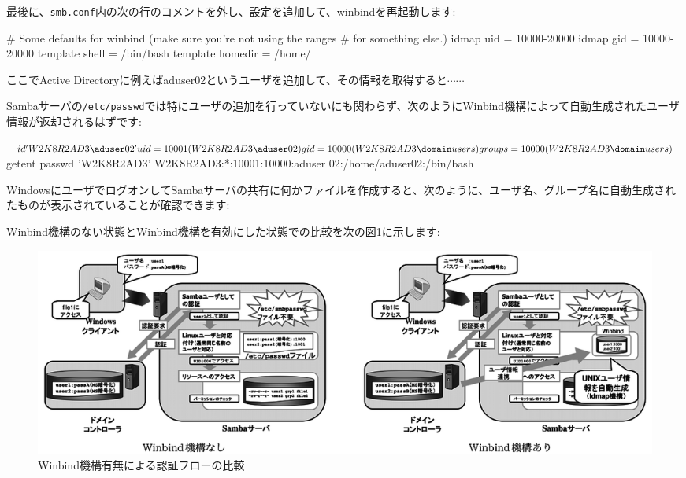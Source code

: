\documentclass[mingoth,a4paper]{jsarticle}
\begin{document}
最後に、{\tt{smb.conf}}内の次の行のコメントを外し、設定を追加して、winbindを再起動します:

\begin{commandline}
# Some defaults for winbind (make sure you're not using the ranges
# for something else.)
   idmap uid = 10000-20000
   idmap gid = 10000-20000
   template shell = /bin/bash
   template homedir = /home/%
\end{commandline}

ここでActive Directoryに例えばaduser02というユーザを追加して、その情報を取得すると$\cdots \cdots$

Sambaサーバの{\tt{/etc/passwd}}では特にユーザの追加を行っていないにも関わらず、次のようにWinbind機構によって自動生成されたユーザ情報が返却されるはずです:

\begin{commandline}
$ id 'W2K8R2AD3\aduser02'
uid=10001(W2K8R2AD3\aduser02) gid=10000(W2K8R2AD3\domain users) groups=10000(W2K8R2AD3\domain users)
$ getent passwd  'W2K8R2AD3'
W2K8R2AD3:*:10001:10000:aduser 02:/home/aduser02:/bin/bash
\end{commandline}

WindowsにユーザでログオンしてSambaサーバの共有に何かファイルを作成すると、次のように、ユーザ名、グループ名に自動生成されたものが表示されていることが確認できます:


Winbind機構のない状態とWinbind機構を有効にした状態での比較を次の図\ref{fig:monyo-winbind1.eps}に示します:

\begin{figure}[h]
\begin{center}
\includegraphics[width=1\hsize]{image201304/samba/monyo-winbind1_mono.png}
\caption{Winbind機構有無による認証フローの比較}
\label{fig:monyo-winbind1.eps}
\end{center}
\end{figure}
\end{document}
